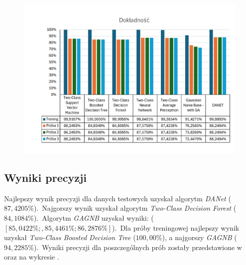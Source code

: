 \begin{figure}[H]
    \centering
    \includegraphics[width=\textwidth]{images/acc-res}
    \label{fig:acc-res}
\end{figure}

\subsection{Wyniki precyzji}
Najlepszy wynik precyzji dla danych testowych uzyskał algorytm \textit{DANet} ($87,4205\%$).\ Najgorszy wynik uzyskał algorytm \textit{Two-Class Decision Forest} ($84,1084\%$).\ Algorytm \textit{GAGNB} uzyskał wyniki: ($[85,0422\%; , 85,4461\%; 86,2876\%]$).\  Dla próby treningowej najlepszy wynik uzyskał \textit{Two-Class Boosted Decision Tree} ($100,00\%$), a najgorszy \textit{GAGNB} ($94,2285\%$).\ Wyniki precyzji dla poszczególnych prób zostały przedstawione w  oraz na wykresie .

